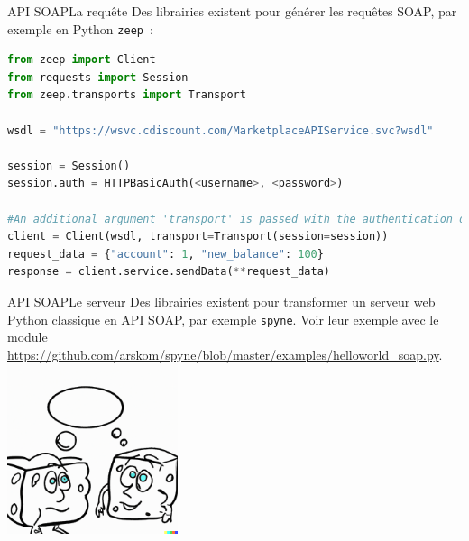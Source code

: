 \documentclass{beamer}
\begin{document}
    \begin{frame}[fragile]{API SOAP}{La requête}
        Des librairies existent pour générer les requêtes SOAP, par exemple en Python \lstinline{zeep}~:
        \begin{lstlisting}[language=python,basicstyle=\ttfamily\tiny]
from zeep import Client
from requests import Session
from zeep.transports import Transport

wsdl = "https://wsvc.cdiscount.com/MarketplaceAPIService.svc?wsdl"

session = Session()
session.auth = HTTPBasicAuth(<username>, <password>)

#An additional argument 'transport' is passed with the authentication details
client = Client(wsdl, transport=Transport(session=session))
request_data = {"account": 1, "new_balance": 100}
response = client.service.sendData(**request_data)
        \end{lstlisting}
    \end{frame}

    \begin{frame}{API SOAP}{Le serveur}
        Des librairies existent pour transformer un serveur web Python classique en API SOAP, par exemple \lstinline{spyne}.
        Voir leur exemple avec le module \url{https://github.com/arskom/spyne/blob/master/examples/helloworld_soap.py}.
        \bigbreak
        \centering
        \includegraphics[width=5cm]{image/soaps-chatting}
    \end{frame}
\end{document}
